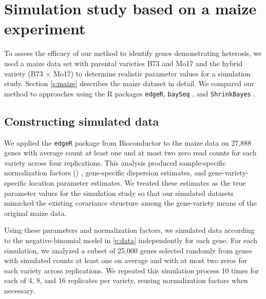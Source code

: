 \documentclass[useAMS,usenatbib,referee]{biom}
\begin{document}
\section{Simulation study based on a maize experiment}
\label{s:simulation}

% 

To assess the efficacy of our method to identify genes demonstrating heterosis, we used a maize data set with parental varieties B73 and Mo17 and the hybrid variety (B73 $\times$ Mo17) \citep{paschold2012complementation} to determine realistic parameter values for a simulation study. Section \ref{s:maize} describes the maize dataset in detail. We compared our method to approaches using the R packages {\tt edgeR}, {\tt baySeq} \citep{hardcastle2010bayseq, hardcastle2012baySeq}, and {\tt ShrinkBayes} \citep{van2014shrinkbayes}.

\subsection{Constructing simulated data}
\label{s:sim_data}

We applied the {\tt edgeR} package \citep{robinson2010edgeR} from Bioconductor \citep{gentleman2004bioconductor} to the maize data on 27,888 genes with average count at least one and at most two zero read counts for each variety across four replications.  This analysis produced  sample-specific normalization factors () %
, gene-specific dispersion estimates, and gene-variety-specific location parameter estimates. We treated these estimates as the true parameter values for the simulation study so that our simulated datasets mimicked the existing covariance structure among the gene-variety means of the original maize data.

Using these parameters and normalization factors, we simulated data according to the negative-binomial model in \eqref{e:data} independently for each gene. For each simulation, we analyzed a subset of 25,000 genes selected randomly from genes with simulated counts at least one on average and with at most two zeros for each variety across replications.  We repeated this simulation process 10 times for each of 4, 8, and 16 replicates per variety, reusing normalization factors when necessary.  
\end{document}
